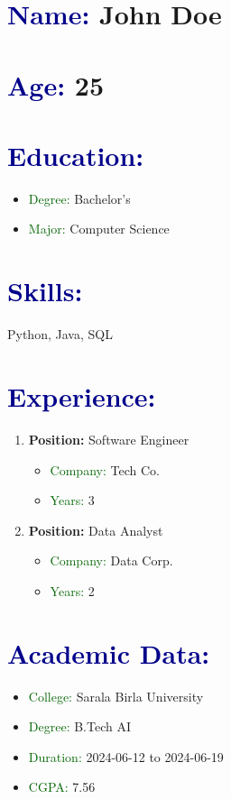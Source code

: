 \documentclass{article}
\begin{document}
\section*{\textcolor{darkblue}{Name:} John Doe}
\section*{\textcolor{darkblue}{Age:} 25}

\section*{\textcolor{darkblue}{Education:}}
\begin{itemize}[label=-, leftmargin=0.5cm]
    \item \textcolor{darkgreen}{Degree:} Bachelor's
    \item \textcolor{darkgreen}{Major:} Computer Science
\end{itemize}

\section*{\textcolor{darkblue}{Skills:}}
Python, Java, SQL

\section*{\textcolor{darkblue}{Experience:}}
\begin{enumerate}[label=\textbf{\arabic*.}, leftmargin=0.5cm]
    \item \textbf{Position:} Software Engineer
    \begin{itemize}[label=-, leftmargin=0.5cm]
        \item \textcolor{darkgreen}{Company:} Tech Co.
        \item \textcolor{darkgreen}{Years:} 3
    \end{itemize}
    \item \textbf{Position:} Data Analyst
    \begin{itemize}[label=-, leftmargin=0.5cm]
        \item \textcolor{darkgreen}{Company:} Data Corp.
        \item \textcolor{darkgreen}{Years:} 2
    \end{itemize}
\end{enumerate}

\section*{\textcolor{darkblue}{Academic Data:}}
\begin{itemize}[label=-, leftmargin=0.5cm]
    \item \textcolor{darkgreen}{College:} Sarala Birla University
    \item \textcolor{darkgreen}{Degree:} B.Tech AI
    \item \textcolor{darkgreen}{Duration:} 2024-06-12 to 2024-06-19
    \item \textcolor{darkgreen}{CGPA:} 7.56
\end{itemize}
\end{document}
